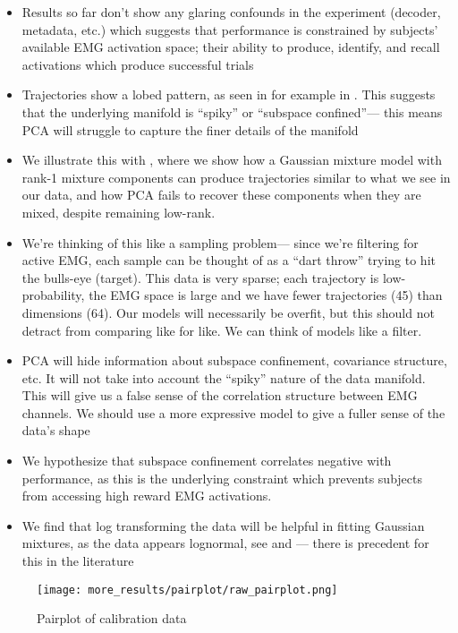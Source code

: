 \documentclass[../main.tex]{subfiles}
\begin{document}
\begin{itemize}
  \setlength\itemsep{0em}
  \item Results so far don't show any glaring confounds in the experiment (decoder, metadata, etc.) which suggests that performance is constrained by subjects' available EMG activation space; their ability to produce, identify, and recall activations which produce successful trials
  \item Trajectories show a lobed pattern, as seen in for example in . This suggests that the underlying manifold is ``spiky'' or ``subspace confined''--- this means PCA will struggle to capture the finer details of the manifold
  \item We illustrate this with , where we show how a Gaussian mixture model with rank-1 mixture components can produce trajectories similar to what we see in our data, and how PCA fails to recover these components when they are mixed, despite remaining low-rank. 
  \item We're thinking of this like a sampling problem--- since we're filtering for active EMG, each sample can be thought of as a ``dart throw'' trying to hit the bulls-eye (target). This data is very sparse; each trajectory is low-probability, the EMG space is large and we have fewer trajectories (45) than dimensions (64). Our models will necessarily be overfit, but this should not detract from comparing like for like. We can think of models like a filter.
  \item PCA will hide information about subspace confinement, covariance structure, etc. It will not take into account the “spiky” nature of the data manifold. This will give us a false sense of the correlation structure between EMG channels. We should use a more expressive model to give a fuller sense of the data's shape
  \item We hypothesize that subspace confinement correlates negative with performance, as this is the underlying constraint which prevents subjects from accessing high reward EMG activations.
  \item We find that log transforming the data will be helpful in fitting Gaussian mixtures, as the data appears lognormal, see  and  --- there is precedent for this in the literature \rbrack
\end{itemize}


\begin{figure}[H]%
  \centering
  \texttt{[image: more\_results/pairplot/raw\_pairplot.png]}
  \caption[Pairplot of calibration data]{Pairplot of calibration data}\label{fig:raw_pairplot}
\end{figure}
\end{document}
